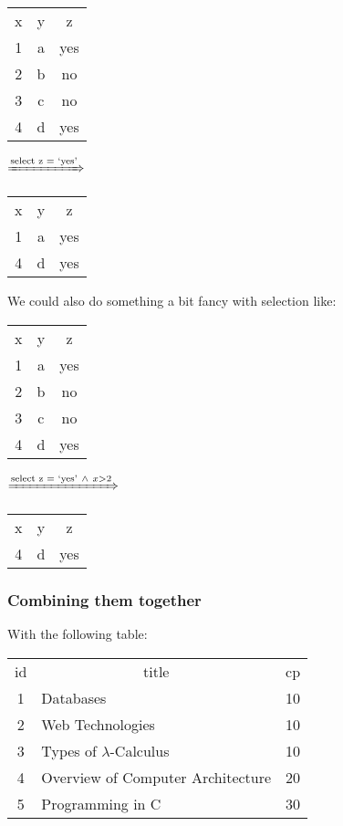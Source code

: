 \documentclass[11pt,a4paper,titlepage,dvipsnames,cmyk]{scrartcl}
\begin{document}
\begin{center}
    \begin{tabular}{c|c|c}
        x & y & z \\
        \hhline{=|=|=}
        1 & a & yes \\
        2 & b & no \\
        3 & c & no \\
        4 & d & yes
    \end{tabular}
    \quad \quad $\xRightarrow{\text{select z = `yes'}}$ \quad \quad
    \begin{tabular}{c|c|c}
        x & y & z \\ \hhline{=|=|=}
        1 & a & yes \\
        4 & d & yes
    \end{tabular}
\end{center}

We could also do something a bit fancy with selection like:

\begin{center}
    \begin{tabular}{c|c|c}
        x & y & z \\
        \hhline{=|=|=}
        1 & a & yes \\
        2 & b & no \\
        3 & c & no \\
        4 & d & yes
    \end{tabular}
    \quad \quad $\xRightarrow{\text{select z = `yes'} \ \wedge \ x>2}$
    \quad \quad
    \begin{tabular}{c|c|c}
        x & y & z \\ \hhline{=|=|=}
        4 & d & yes
    \end{tabular}
\end{center}

\subsubsection{Combining them together}%
\label{ssub:combining}
With the following table:

\begin{center}
    \begin{tabular}{c|l|c}
        id & \multicolumn{1}{|c|}{title} & cp \\ \hhline{=|=|=}
        1 & Databases & 10 \\
        2 & Web Technologies & 10 \\
        3 & Types of $\lambda$-Calculus & 10 \\
        4 & Overview of Computer Architecture & 20 \\
        5 & Programming in C & 30 \\
    \end{tabular}
\end{center}
\end{document}

